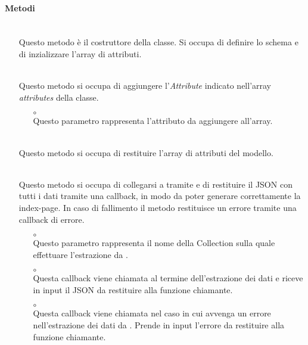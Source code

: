 \paragraph*{Metodi}
\begin{itemize}
\item[]  \\ Questo metodo è il costruttore della classe. Si occupa di definire lo schema e di inzializzare l'array di attributi.
\item[]  \\ Questo metodo si occupa di aggiungere l'\textit{Attribute} indicato nell'array \textit{attributes} della classe.
\begin{itemize}\addtolength{\itemsep}{-0.5\baselineskip}
\item[$\circ$]  \\ Questo parametro rappresenta l'attributo da aggiungere all'array.
\end{itemize}
\item[]  \\ Questo metodo si occupa di restituire l'array di attributi del modello.
\item[]  \\ Questo metodo si occupa di collegarsi a  tramite  e di restituire il JSON con tutti i dati tramite una callback, in modo da poter generare correttamente la index-page. In caso di fallimento il metodo restituisce un errore tramite una callback di errore.
\begin{itemize}\addtolength{\itemsep}{-0.5\baselineskip}
\item[$\circ$]  \\ Questo parametro rappresenta il nome della Collection sulla quale effettuare l'estrazione da .
\item[$\circ$]  \\ Questa callback viene chiamata al termine dell'estrazione dei dati e riceve in input il JSON da restituire alla funzione chiamante.
\item[$\circ$]  \\ Questa callback viene chiamata nel caso in cui avvenga un errore nell'estrazione dei dati da . Prende in input l'errore da restituire alla funzione chiamante.
\end{itemize}
\end{itemize}

